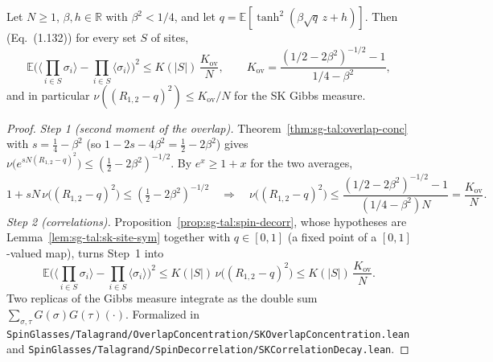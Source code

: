 \begin{theorem}\label{thm:sg-tal:sk-correlation-decay}
  \leanok
{}
Let $N\ge1$, $\beta,h\in\mathbb R$ with $\beta^2<1/4$, and let $q=\mathbb{E}[\tanh^2(\beta\sqrt q\,z+h)]$. Then (Eq.~(1.132)) for every set $S$ of sites,
\[
\mathbb{E}\Big(\Big\langle\prod_{i\in S}\sigma_i\Big\rangle-\prod_{i\in S}\langle\sigma_i\rangle\Big)^2\le K(|S|)\,\frac{K_{\mathrm{ov}}}{N},\qquad K_{\mathrm{ov}}=\frac{(1/2-2\beta^2)^{-1/2}-1}{1/4-\beta^2},
\]
and in particular $\nu((R_{1,2}-q)^2)\le K_{\mathrm{ov}}/N$ for the SK Gibbs measure.
\end{theorem}
\begin{proof}
\leanok
\emph{Step 1 (second moment of the overlap).} Theorem~\ref{thm:sg-tal:overlap-conc} with $s=\frac14-\beta^2$ (so $1-2s-4\beta^2=\frac12-2\beta^2$) gives $\nu\big(e^{sN(R_{1,2}-q)^2}\big)\le(\frac12-2\beta^2)^{-1/2}$. By $e^x\ge1+x$ for the two averages,
\[
1+sN\,\nu\big((R_{1,2}-q)^2\big)\le(\tfrac12-2\beta^2)^{-1/2}\quad\Longrightarrow\quad\nu\big((R_{1,2}-q)^2\big)\le\frac{(1/2-2\beta^2)^{-1/2}-1}{(1/4-\beta^2)N}=\frac{K_{\mathrm{ov}}}N .
\]
\emph{Step 2 (correlations).} Proposition~\ref{prop:sg-tal:spin-decorr}, whose hypotheses are Lemma~\ref{lem:sg-tal:sk-site-sym} together with $q\in[0,1]$ (a fixed point of a $[0,1]$-valued map), turns Step~1 into
\[
\mathbb{E}\Big(\Big\langle\prod_{i\in S}\sigma_i\Big\rangle-\prod_{i\in S}\langle\sigma_i\rangle\Big)^2\le K(|S|)\,\nu\big((R_{1,2}-q)^2\big)\le K(|S|)\,\frac{K_{\mathrm{ov}}}N .
\]
Two replicas of the Gibbs measure integrate as the double sum $\sum_{\sigma,\tau}G(\sigma)G(\tau)(\cdot)$.
Formalized in \texttt{SpinGlasses/Talagrand/OverlapConcentration/SKOverlapConcentration.lean} and \texttt{SpinGlasses/Talagrand/SpinDecorrelation/SKCorrelationDecay.lean}.
\end{proof}

